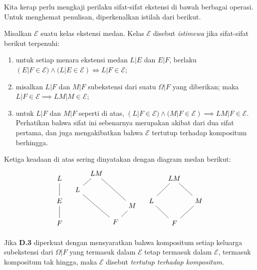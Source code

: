 Kita kerap perlu mengkaji perilaku sifat-sifat ekstensi di bawah berbagai operasi. Untuk menghemat penulisan, diperkenalkan istilah dari \cite[V. \S 1]{Lang02} berikut.
\begin{convention}\label{con:dist-extensions}
	Misalkan $\mathcal{E}$ suatu kelas ekstensi medan. Kelas $\mathcal{E}$ disebut \emph{istimewa} jika sifat-sifat berikut terpenuhi:
	\begin{enumerate}[\bfseries {D}.1]
		\item untuk setiap menara ekstensi medan $L|E$ dan $E|F$, berlaku $(E|F \in \mathcal{E}) \wedge (L|E \in \mathcal{E}) \iff L|F \in \mathcal{E}$;
		\item misalkan $L|F$ dan $M|F$ subekstensi dari suatu $\Omega|F$ yang diberikan; maka $L|F \in \mathcal{E} \implies LM|M \in \mathcal{E}$;
		\item untuk $L|F$ dan $M|F$ seperti di atas, $(L|F \in \mathcal{E}) \wedge (M|F \in \mathcal{E}) \implies LM|F \in \mathcal{E}$. Perhatikan bahwa sifat ini sebenarnya merupakan akibat dari dua sifat pertama, dan juga mengakibatkan bahwa $\mathcal{E}$ tertutup terhadap kompositum berhingga.
	\end{enumerate}
	Ketiga keadaan di atas sering dinyatakan dengan diagram medan berikut:
	\[ \begin{tikzcd}
		L \arrow[dash,d] \\ E \arrow[dash,d] \\ F
	\end{tikzcd} \quad \begin{tikzcd}[row sep=small, column sep=tiny]
		& LM \arrow[dash,ld] \arrow[dash,rrdd] & & \\
		L \arrow[dash,rrdd] & & & \\
		& & & M \arrow[dash,ld] \\
		& & F &\\
	\end{tikzcd} \quad \begin{tikzcd}[column sep=small]
		& LM \arrow[dash,ld] \arrow[dash,rd] & \\
		L \arrow[dash,rd] & & M \arrow[dash,ld] \\
		& F &
	\end{tikzcd}\]
	Jika \textbf{D.3} diperkuat dengan mensyaratkan bahwa kompositum setiap keluarga subekstensi dari $\Omega|F$ yang termasuk dalam $\mathcal{E}$ tetap termasuk dalam $\mathcal{E}$, termasuk kompositum tak hingga, maka $\mathcal{E}$ disebut \emph{tertutup terhadap kompositum}.
\end{convention}

